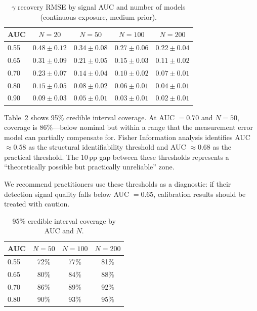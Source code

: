 \documentclass[letterpaper]{article}
\begin{document}
\begin{table}[t]
\centering
\caption{$\gamma$ recovery RMSE by signal AUC and number of models (continuous exposure, medium prior).}
\label{tab:ident_rmse}
\begin{tabular}{lcccc}
\toprule
\textbf{AUC} & $N{=}20$ & $N{=}50$ & $N{=}100$ & $N{=}200$ \\
\midrule
0.55 & $0.48{\pm}0.12$ & $0.34{\pm}0.08$ & $0.27{\pm}0.06$ & $0.22{\pm}0.04$ \\
0.65 & $0.31{\pm}0.09$ & $0.21{\pm}0.05$ & $0.15{\pm}0.03$ & $0.11{\pm}0.02$ \\
0.70 & $0.23{\pm}0.07$ & $0.14{\pm}0.04$ & $0.10{\pm}0.02$ & $0.07{\pm}0.01$ \\
0.80 & $0.15{\pm}0.05$ & $0.08{\pm}0.02$ & $0.06{\pm}0.01$ & $0.04{\pm}0.01$ \\
0.90 & $0.09{\pm}0.03$ & $0.05{\pm}0.01$ & $0.03{\pm}0.01$ & $0.02{\pm}0.01$ \\
\bottomrule
\end{tabular}
\end{table}

Table~\ref{tab:ident_coverage} shows 95\% credible interval coverage.
At AUC $= 0.70$ and $N{=}50$, coverage is 86\%---below nominal but within a range that the measurement error model can partially compensate for.
Fisher Information analysis identifies AUC ${\approx} 0.58$ as the structural identifiability threshold and AUC ${\approx} 0.68$ as the practical threshold.
The 10\,pp gap between these thresholds represents a ``theoretically possible but practically unreliable'' zone.

We recommend practitioners use these thresholds as a diagnostic: if their detection signal quality falls below AUC $= 0.65$, calibration results should be treated with caution.

\begin{table}[t]
\centering
\caption{95\% credible interval coverage by AUC and $N$.}
\label{tab:ident_coverage}
\begin{tabular}{lccc}
\toprule
\textbf{AUC} & $N{=}50$ & $N{=}100$ & $N{=}200$ \\
\midrule
0.55 & 72\% & 77\% & 81\% \\
0.65 & 80\% & 84\% & 88\% \\
0.70 & 86\% & 89\% & 92\% \\
0.80 & 90\% & 93\% & 95\% \\
\bottomrule
\end{tabular}
\end{table}
\end{document}
